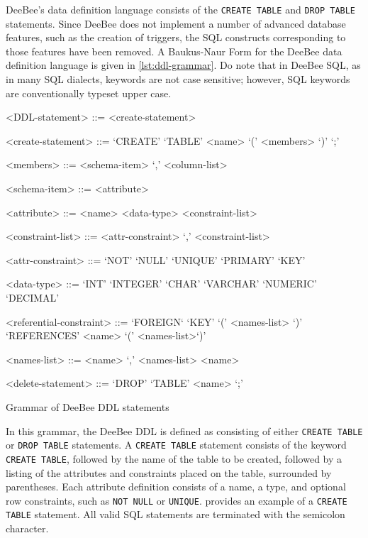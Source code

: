 DeeBee's data definition language consists of the \texttt{CREATE TABLE} and \texttt{DROP TABLE} statements. Since DeeBee does not implement a number of advanced database features, such as the creation of triggers, the SQL constructs corresponding to those features have been removed. A Baukus-Naur Form for the DeeBee data definition language is given in \cref{lst:ddl-grammar}. Do note that in DeeBee SQL, as in many SQL dialects, keywords are not case sensitive; however, SQL keywords are conventionally typeset upper case.
\begin{listing}[h]
\begin{grammar}
<DDL-statement>  ::= <create-statement>
	 \alt <drop-statement>
	 
<create-statement> ::= `CREATE' `TABLE' <name> `(' <members> `)' `;'

<members> ::= <schema-item> `,' <column-list>
	\alt <schema-item>

<schema-item> ::= <attribute>  	 
	
<attribute> ::= <name> <data-type> <constraint-list>

<constraint-list> ::= <attr-constraint> `,' <constraint-list>
	\alt <attr-constraint>
	
<attr-constraint> ::= `NOT' `NULL' \alt `UNIQUE' \alt `PRIMARY' `KEY'

<data-type> ::= `INT'  \alt `INTEGER' \alt `CHAR' \alt `VARCHAR' \alt `NUMERIC'  \alt `DECIMAL'

<referential-constraint> ::= `FOREIGN` `KEY' `(' <names-list> `)' `REFERENCES' <name> `(' <names-list>`)'

<names-list> ::= <name> `,' <names-list> \alt <name>

<delete-statement> ::= `DROP' `TABLE' <name> `;'
\end{grammar}
\caption{Grammar of DeeBee DDL statements}
\label{lst:ddl-grammar}
\end{listing}

In this grammar, the DeeBee DDL is defined as consisting of either \texttt{CREATE TABLE} or \texttt{DROP TABLE} statements.  A \texttt{CREATE TABLE} statement consists of the keyword \texttt{CREATE TABLE}, followed by the name of the table to be created, followed by a listing of the attributes and constraints placed on the table, surrounded by parentheses. Each attribute definition consists of a name, a type, and optional row constraints, such as \texttt{NOT NULL} or \texttt{UNIQUE}.  provides an example of a \texttt{CREATE TABLE} statement. All valid SQL statements are terminated with the semicolon character.

